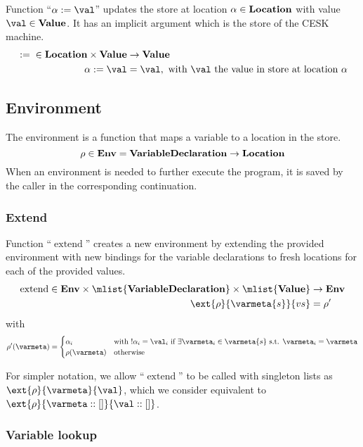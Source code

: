 \documentclass[a4paper,oneside]{article}
\DeclareMathOperator{\extend}{extend}
\begin{document}
\newcommand{\update}[2]{{#1} := {#2}}
Function ``$\update{\loc}{\val}$'' updates the store at location $\alpha \in \mathbf{Location}$ with value $\val \in \dval$.
It has an implicit argument which is the store of the CESK machine.
\begin{align*}
  \update{}{} \in \dlocation \times \dval &\rightarrow  \dval\\
  \update{\loc}{\val} &= \val, \text{ with $\val$ the value in store at location $\loc$}
\end{align*}


\subsection{Environment}
\label{subsec:env-definition}

The environment is a function that maps a variable to a location in the store.
\[\rho \in \mathbf{Env} = \mathbf{VariableDeclaration} \rightarrow \mathbf{Location}\]
When an environment is needed to further execute the program, it is saved by the caller in the corresponding continuation.


\subsubsection{Extend}
\label{subsubsec:extend-env}

Function ``$\extend$'' creates a new environment by extending the provided environment with new bindings for the variable declarations to fresh locations for each of the provided values.
\begin{align*}
  \extend \in \denv \times \mlist{\dvardecl} \times \mlist{\dval} &\rightarrow  \denv\\
  \ext{\env}{\varmeta{s}}{\vals} &= \env'
\end{align*}
with
\[
    \env'(\varmeta) =\begin{cases}
    \loc_i & \text{with }\deref{\loc_i} = \val_i\text{ if }\exists\varmeta_i \in \varmeta{s} \text{ s.t. } \varmeta_i = \varmeta\\
    \env(\varmeta) &\text{otherwise}
    \end{cases}
\]

For simpler notation, we allow ``$\extend$'' to be called with singleton lists as $\ext{\env}{\varmeta}{\val}$, which we consider equivalent to $\ext{\env}{\varmeta :: []}{\val :: []}$.


\subsubsection{Variable lookup}
\label{subsubsec:variable-lookup}
\end{document}
